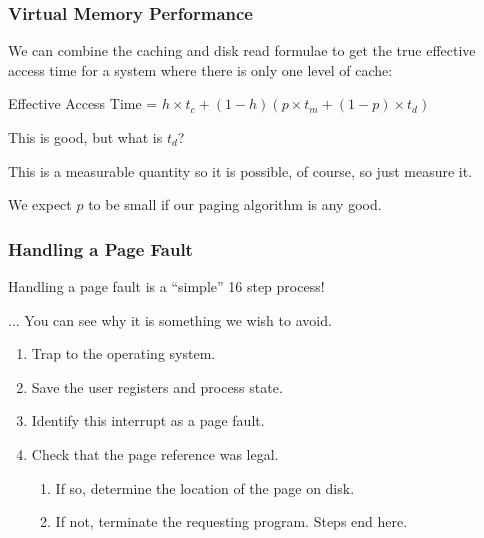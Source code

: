 \begin{frame}
\frametitle{Virtual Memory Performance}

We can combine the caching and disk read formulae to get the true effective access time for a system where there is only one level of cache:

\begin{center}
	Effective Access Time = $ h \times t_{c} + (1 - h) ( p \times t_{m} + (1 - p) \times t_{d})$
\end{center}

This is good, but what is $t_{d}$? 

This is a measurable quantity so it is possible, of course, so just measure it.

We expect $p$ to be small if our paging algorithm is any good.

\end{frame}



\begin{frame}
\frametitle{Handling a Page Fault}

Handling a page fault is a ``simple'' 16 step process!

... You can see why it is something we wish to avoid.

\begin{enumerate}
	\item Trap to the operating system.
	\item Save the user registers and process state.
	\item Identify this interrupt as a page fault.
	\item Check that the page reference was legal. 
	\begin{enumerate}
		\item If so, determine the location of the page on disk.
		\item If not, terminate the requesting program. Steps end here.
	\end{enumerate}
	\setcounter{pf}{\theenumi}
\end{enumerate}

\end{frame}

